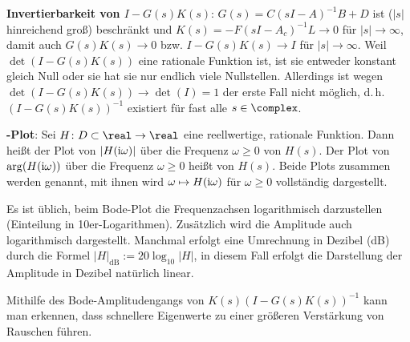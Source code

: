 \textbf{Invertierbarkeit von $I - G(s)K(s)$}:
$G(s) = C(sI - A)^{-1} B + D$ ist ($|s|$ hinreichend groß) beschränkt und
$K(s) = -F(sI - A_c)^{-1} L \to 0$ für $|s| \to \infty$,
damit auch $G(s)K(s) \to 0$ bzw. $I - G(s)K(s) \to I$ für $|s| \to \infty$.
Weil $\det(I - G(s)K(s))$ eine rationale Funktion ist, ist sie entweder konstant gleich Null
oder sie hat sie nur endlich viele Nullstellen.
Allerdings ist wegen $\det(I - G(s)K(s)) \to \det(I) = 1$ der erste Fall nicht möglich, d.\,h.
$(I - G(s)K(s))^{-1}$ existiert für fast alle $s \in \complex$.

\linie

\textbf{-Plot}:
Sei $H\colon D \subset \real \rightarrow \real$ eine reellwertige, rationale Funktion.
Dann heißt der Plot von $|H(\text{i}\omega)|$ über die Frequenz $\omega \ge 0$
 von $H(s)$.
Der Plot von $\arg(H(\text{i}\omega))$ über die Frequenz $\omega \ge 0$ heißt
 von $H(s)$.
Beide Plots zusammen werden  genannt,
mit ihnen wird $\omega \mapsto H(\text{i}\omega)$ für $\omega \ge 0$ vollständig dargestellt.

Es ist üblich, beim Bode-Plot die Frequenzachsen logarithmisch darzustellen
(Einteilung in 10er-Logarithmen).
Zusätzlich wird die Amplitude auch logarithmisch dargestellt.
Manchmal erfolgt eine Umrechnung in Dezibel (dB) durch die Formel
$|H|_{\text{dB}} := 20 \log_{10} |H|$,
in diesem Fall erfolgt die Darstellung der Amplitude in Dezibel natürlich linear.

Mithilfe des Bode-Amplitudengangs von $K(s) (I - G(s)K(s))^{-1}$
kann man erkennen, dass schnellere Eigenwerte zu einer größeren Verstärkung von Rauschen führen.

\pagebreak
